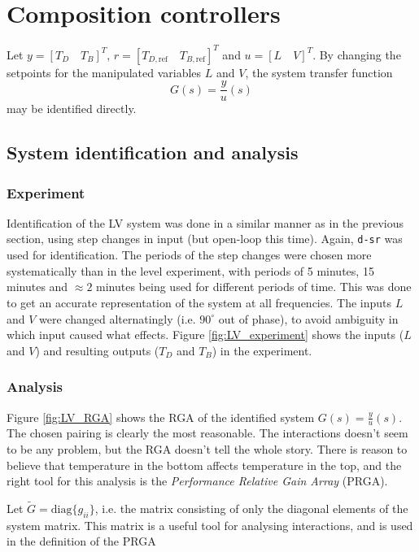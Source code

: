 \documentclass[12pt]{article}
\begin{document}
\newpage
\section{Composition controllers}
Let $y = [T_D \quad T_B]^T$, $r = [T_{D, \textrm{ref}} \quad T_{B, \textrm{ref}}]^T$ and $u = [L \quad V]^T$. By changing the setpoints for the manipulated variables $L$ and $V$, the system transfer function
\begin{equation}
G(s) = \frac{y}{u}(s)
\end{equation}
may be identified directly.
\subsection{System identification and analysis}
\subsubsection{Experiment}
Identification of the LV system was done in a similar manner as in the previous section, using step changes in input (but open-loop this time). Again, \texttt{d-sr} was used for identification. The periods of the step changes were chosen more systematically than in the level experiment, with periods of 5 minutes, 15 minutes and $\approx2$ minutes being used for different periods of time. This was done to get an accurate representation of the system at all frequencies. The inputs $L$ and $V$ were changed alternatingly (i.e. $90^\circ$ out of phase), to avoid ambiguity in which input caused what effects. Figure \ref{fig:LV_experiment} shows the inputs ($L$ and $V$) and resulting outputs ($T_D$ and $T_B$) in the experiment.

\subsubsection{Analysis}
Figure \ref{fig:LV_RGA} shows the RGA of the identified system $G(s) = \frac{y}{u}(s)$. The chosen pairing is clearly the most reasonable. The interactions doesn't seem to be any problem, but the RGA doesn't tell the whole story. There is reason to believe that temperature in the bottom affects temperature in the top, and the right tool for this analysis is the \textit{Performance Relative Gain Array} (PRGA).

Let $\tilde{G} = \textrm{diag}\{g_{ii}\}$, i.e. the matrix consisting of only the diagonal elements of the system matrix. This matrix is a useful tool for analysing interactions, and is used in the definition of the PRGA
\end{document}
